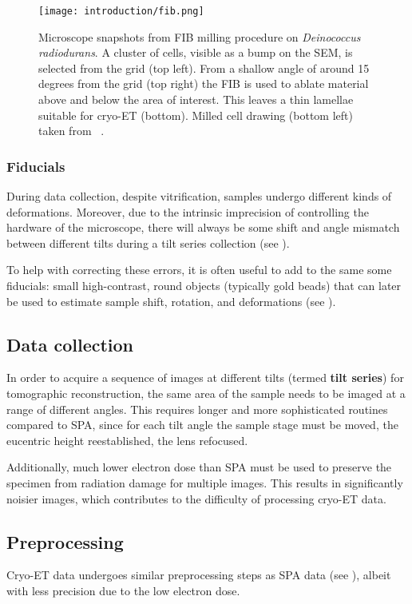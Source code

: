 \begin{figure}[ht]
    \centering
    \texttt{[image: introduction/fib.png]}
    \caption[FIB milling]{Microscope snapshots from FIB milling procedure on \textit{Deinococcus radiodurans}. A cluster of cells, visible as a bump on the SEM, is selected from the grid (top left). From a shallow angle of around 15 degrees from the grid (top right) the FIB is used to ablate material above and below the area of interest. This leaves a thin lamellae suitable for cryo-ET (bottom). Milled cell drawing (bottom left) taken from ~\citet{villaOpeningWindowsCell2013}.}
    \label{fig:et_fib_milling}
\end{figure}

\subsubsection{Fiducials}
During data collection, despite vitrification, samples undergo different kinds of deformations.
Moreover, due to the intrinsic imprecision of controlling the hardware of the microscope, there will always be some shift and angle mismatch between different tilts during a tilt series collection (see ).

To help with correcting these errors, it is often useful to add to the same some fiducials: small high-contrast, round objects (typically gold beads) that can later be used to estimate sample shift, rotation, and deformations (see ).

\subsection{Data collection}\label{et_data_collection}
In order to acquire a sequence of images at different tilts (termed \textbf{tilt series}) for tomographic reconstruction, the same area of the sample needs to be imaged at a range of different angles.
This requires longer and more sophisticated routines compared to SPA, since for each tilt angle the sample stage must be moved, the eucentric height reestablished, the lens refocused.

Additionally, much lower electron dose than SPA must be used to preserve the specimen from radiation damage for multiple images.
This results in significantly noisier images, which contributes to the difficulty of processing cryo-ET data.

\subsection{Preprocessing}
Cryo-ET data undergoes similar preprocessing steps as SPA data (see ), albeit with less precision due to the low electron dose.

